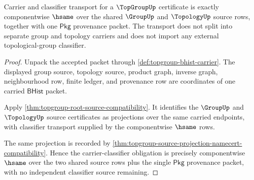 \begin{theorem}
\label{thm:topgroup-carrier-classifier-obligation}
Carrier and classifier transport for a $\TopGroupUp$ certificate is exactly
componentwise $\hsame$ over the shared $\GroupUp$ and $\TopologyUp$ source rows,
together with one $\mathsf{Pkg}$ provenance packet. The transport does not
split into separate group and topology carriers and does not import any
external topological-group classifier.
\end{theorem}
\begin{proof}
Unpack the accepted packet through \autoref{def:topgroup-bhist-carrier}. The
displayed group source, topology source, product graph, inverse graph,
neighbourhood row, finite ledger, and provenance row are coordinates of one
carried $\mathsf{BHist}$ packet.

Apply \autoref{thm:topgroup-root-source-compatibility}. It identifies the
$\GroupUp$ and $\TopologyUp$ source certificates as projections over the same
carried endpoints, with classifier transport supplied by the componentwise
$\hsame$ rows.

The same projection is recorded by
\autoref{thm:topgroup-source-projection-namecert-compatibility}. Hence the
carrier-classifier obligation is precisely componentwise $\hsame$ over the two
shared source rows plus the single $\mathsf{Pkg}$ provenance packet, with no
independent classifier source remaining.
\end{proof}

